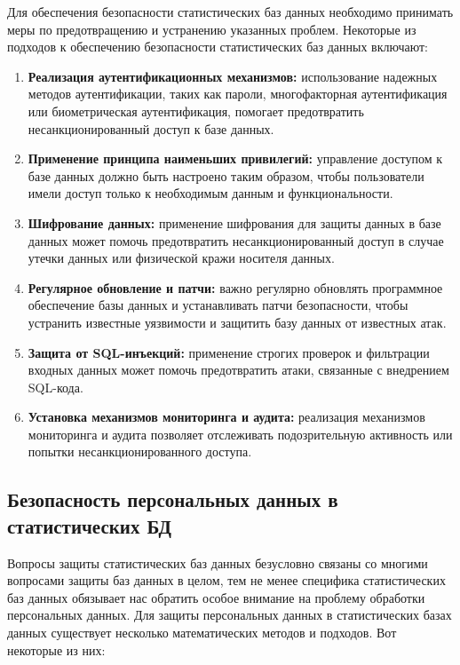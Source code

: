 Для обеспечения безопасности статистических баз данных необходимо принимать меры по предотвращению и устранению указанных проблем. Некоторые из подходов к обеспечению безопасности статистических баз данных включают:
\\

\begin{enumerate}
    \item \textbf{Реализация аутентификационных механизмов:} использование надежных методов аутентификации, таких как пароли, многофакторная аутентификация или биометрическая аутентификация, помогает предотвратить несанкционированный доступ к базе данных.

    \item \textbf{Применение принципа наименьших привилегий:}
    управление доступом к базе данных должно быть настроено таким образом, чтобы пользователи имели доступ только к необходимым данным и функциональности.

    \item \textbf{Шифрование данных:}
    применение шифрования для защиты данных в базе данных может помочь предотвратить несанкционированный доступ в случае утечки данных или физической кражи носителя данных.

    \item \textbf{Регулярное обновление и патчи:}
    важно регулярно обновлять программное обеспечение базы данных и устанавливать патчи безопасности, чтобы устранить известные уязвимости и защитить базу данных от известных атак.

    \item \textbf{Защита от SQL-инъекций:}
    применение строгих проверок и фильтрации входных данных может помочь предотвратить атаки, связанные с внедрением SQL-кода.

    \item \textbf{Установка механизмов мониторинга и аудита:}
    реализация механизмов мониторинга и аудита позволяет отслеживать подозрительную активность или попытки несанкционированного доступа. 
\end{enumerate}
\subsection{Безопасность персональных данных в статистических БД}

Вопросы защиты статистических баз данных безусловно связаны со многими вопросами защиты баз данных в целом, тем не менее специфика статистических баз данных обязывает нас обратить особое внимание на проблему обработки персональных данных. Для защиты персональных данных в статистических базах данных существует несколько математических методов и подходов. Вот некоторые из них:
\\

